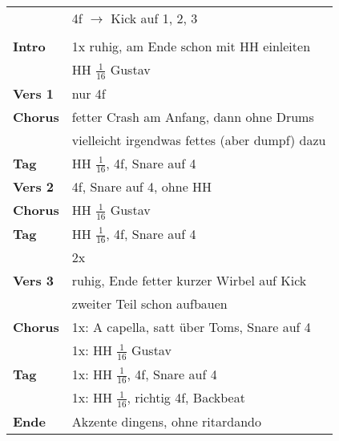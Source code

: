 
\begin{tabular}{p{1.6cm}l}
	                & 4f $\rightarrow$ Kick auf 1, 2, 3             \\
	                &                                               \\
	\textbf{Intro}  & 1x ruhig, am Ende schon mit HH einleiten      \\
	                & HH $\frac{1}{16}$ Gustav                      \\
	\textbf{Vers 1} & nur 4f                                        \\
	\textbf{Chorus} & fetter Crash am Anfang, dann ohne Drums       \\
	                & vielleicht irgendwas fettes (aber dumpf) dazu \\
	\textbf{Tag}    & HH $\frac{1}{16}$, 4f, Snare auf 4            \\
	\textbf{Vers 2} & 4f, Snare auf 4, ohne HH                      \\
	\textbf{Chorus} & HH $\frac{1}{16}$ Gustav                      \\
	\textbf{Tag}    & HH $\frac{1}{16}$, 4f, Snare auf 4            \\
	                & 2x                                            \\
	\textbf{Vers 3} & ruhig, Ende fetter kurzer Wirbel auf Kick     \\
	                & zweiter Teil schon aufbauen                   \\
	\textbf{Chorus} & 1x: A capella, satt über Toms, Snare auf 4    \\
	                & 1x: HH $\frac{1}{16}$ Gustav                  \\
	\textbf{Tag}    & 1x: HH $\frac{1}{16}$, 4f, Snare auf 4        \\
	                & 1x: HH $\frac{1}{16}$, richtig 4f, Backbeat   \\
	\textbf{Ende}   & Akzente dingens, ohne ritardando              \\
\end{tabular}
